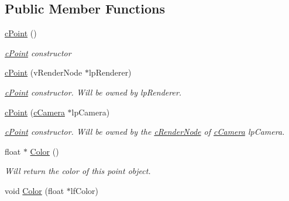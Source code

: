 \subsection*{Public Member Functions}
\begin{DoxyCompactItemize}
\item 
\hypertarget{classc_point_a2a1ced307ad76494d92cc2f7a97cf747}{
\hyperlink{classc_point_a2a1ced307ad76494d92cc2f7a97cf747}{cPoint} ()}
\label{classc_point_a2a1ced307ad76494d92cc2f7a97cf747}

\begin{DoxyCompactList}\small\item\em \hyperlink{classc_point}{cPoint} constructor \end{DoxyCompactList}\item 
\hypertarget{classc_point_adc2414fb40e459bfeaca2c2429ab4ed8}{
\hyperlink{classc_point_adc2414fb40e459bfeaca2c2429ab4ed8}{cPoint} (vRenderNode $\ast$lpRenderer)}
\label{classc_point_adc2414fb40e459bfeaca2c2429ab4ed8}

\begin{DoxyCompactList}\small\item\em \hyperlink{classc_point}{cPoint} constructor. Will be owned by lpRenderer. \end{DoxyCompactList}\item 
\hypertarget{classc_point_a67d2663aa7b4befd4d23358aae432568}{
\hyperlink{classc_point_a67d2663aa7b4befd4d23358aae432568}{cPoint} (\hyperlink{classc_camera}{cCamera} $\ast$lpCamera)}
\label{classc_point_a67d2663aa7b4befd4d23358aae432568}

\begin{DoxyCompactList}\small\item\em \hyperlink{classc_point}{cPoint} constructor. Will be owned by the \hyperlink{classc_render_node}{cRenderNode} of \hyperlink{classc_camera}{cCamera} lpCamera. \end{DoxyCompactList}\item 
\hypertarget{classc_point_a6845b93cde3a556bab19b7a9379944d5}{
float $\ast$ \hyperlink{classc_point_a6845b93cde3a556bab19b7a9379944d5}{Color} ()}
\label{classc_point_a6845b93cde3a556bab19b7a9379944d5}

\begin{DoxyCompactList}\small\item\em Will return the color of this point object. \end{DoxyCompactList}\item 
\hypertarget{classc_point_a47275a9dc45a1085e2a26e3ccb4a4912}{
void \hyperlink{classc_point_a47275a9dc45a1085e2a26e3ccb4a4912}{Color} (float $\ast$lfColor)}
\label{classc_point_a47275a9dc45a1085e2a26e3ccb4a4912}


\end{DoxyCompactItemize}
